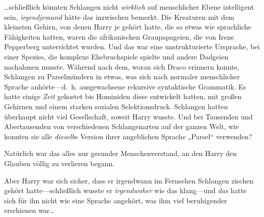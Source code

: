 …schließlich könnten Schlangen nicht \emph{wirklich} auf menschlicher Ebene intelligent sein, \emph{irgendjemand} hätte das inzwischen bemerkt. Die Kreaturen mit dem kleinsten Gehirn, von denen Harry je gehört hatte, die so etwas wie sprachliche Fähigkeiten hatten, waren die afrikanischen Graupapageien, die von Irene Pepperberg unterrichtet wurden. Und das war eine unstrukturierte Ursprache, bei einer Spezies, die komplexe Ehebruchspiele spielte und andere Dadgeien nachahmen musste. Während nach dem, woran sich Draco erinnern konnte, Schlangen zu Parselmündern in etwas, was sich nach normaler menschlicher Sprache anhörte—d.~h. ausgewachsene rekursive syntaktische Grammatik. Es hatte einige \emph{Zeit} gekostet bis Hominiden diese entwickelt hatten, mit großen Gehirnen und einem starken sozialen Selektionsdruck. Schlangen hatten überhaupt nicht viel Gesellschaft, soweit Harry wusste. Und bei Tausenden und Abertausenden von verschiedenen Schlangenarten auf der ganzen Welt, wie konnten sie alle \emph{dieselbe} Version ihrer angeblichen Sprache „Parsel“ verwenden?

Natürlich war das alles nur gesunder Menschenverstand, an den Harry den Glauben völlig zu verlieren begann.

Aber Harry war sich sicher, dass er irgendwann im Fernsehen Schlangen zischen gehört hatte—schließlich wusste er \emph{irgendwoher} wie das klang—und \emph{das} hatte sich für ihn nicht wie eine Sprache angehört, was ihm viel beruhigender erschienen war…

